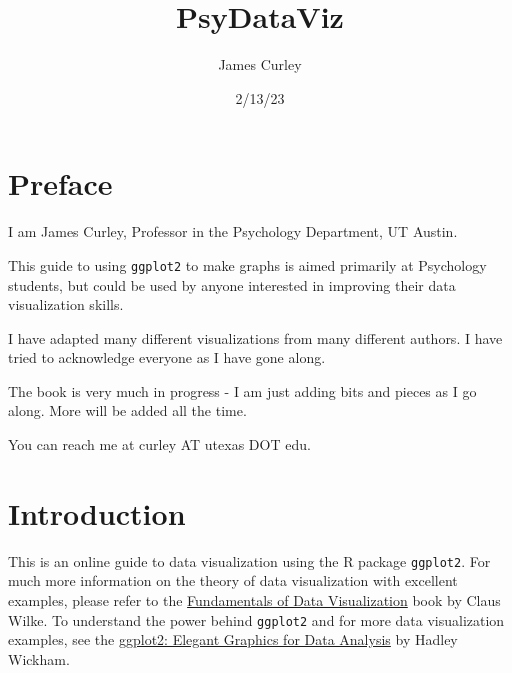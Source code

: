 \documentclass[
  letterpaper,
  DIV=11,
  numbers=noendperiod]{scrreprt}
\title{PsyDataViz}
\author{James Curley}
\date{2/13/23}
\renewcommand*\contentsname{Table of contents}
\newcommand\contentsname{Table of contents}
\begin{document}
\maketitle
\ifdefined\Shaded\renewenvironment{Shaded}{\begin{tcolorbox}[boxrule=0pt, sharp corners, borderline west={3pt}{0pt}{shadecolor}, frame hidden, enhanced, breakable, interior hidden]}{\end{tcolorbox}}\fi

\renewcommand*\contentsname{Table of contents}
{
\hypersetup{linkcolor=}
\setcounter{tocdepth}{2}
\tableofcontents
}

\hypertarget{preface}{%
\chapter*{Preface}\label{preface}}


I am James Curley, Professor in the Psychology Department, UT Austin.

This guide to using \texttt{ggplot2} to make graphs is aimed primarily
at Psychology students, but could be used by anyone interested in
improving their data visualization skills.

I have adapted many different visualizations from many different
authors. I have tried to acknowledge everyone as I have gone along.

The book is very much in progress - I am just adding bits and pieces as
I go along. More will be added all the time.

You can reach me at curley AT utexas DOT edu.


\hypertarget{introduction}{%
\chapter{Introduction}\label{introduction}}

This is an online guide to data visualization using the R package
\texttt{ggplot2}. For much more information on the theory of data
visualization with excellent examples, please refer to the
\href{https://serialmentor.com/dataviz/}{Fundamentals of Data
Visualization} book by Claus Wilke. To understand the power behind
\texttt{ggplot2} and for more data visualization examples, see the
\href{https://ggplot2-book.org/index.html}{ggplot2: Elegant Graphics for
Data Analysis} by Hadley Wickham.
\end{document}
